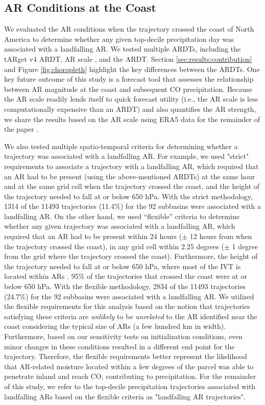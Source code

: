 \documentclass[draft]{agujournal2019}
\begin{document}
\subsection{AR Conditions at the Coast}
\label{sec:methods:ar_conditions}
We evaluated the AR conditions when the trajectory crossed the coast of North America to determine whether any given top-decile precipitation day was associated with a landfalling AR. We tested multiple ARDTs, including the  tARget v4 ARDT, AR scale \cite{MartinRalph2019}, and the  ARDT. Section \ref{sec:results:contribution} and Figure \ref{fig:choropleth} highlight the key differences between the ARDTs. One key future outcome of this study is a forecast tool that assesses the relationship between AR magnitude at the coast and subsequent CO precipitation. Because the AR scale readily lends itself to quick forecast utility (i.e., the AR scale is less computationally expensive than an ARDT) and also quantifies the AR strength, we share the results based on the AR scale using ERA5 data for the remainder of the paper \cite{MartinRalph2019}.

We also tested multiple spatio-temporal criteria for determining whether a trajectory was associated with a landfalling AR. For example, we used "strict" requirements to associate a trajectory with a landfalling AR, which required that an AR had to be present (using the above-mentioned ARDTs) at the same hour and at the same grid cell when the trajectory crossed the coast, and the height of the trajectory needed to fall at or below 650 hPa. With the strict methodology, 1314 of the 11493 trajectories (11.4\%) for the 92 subbasins were associated with a landfalling AR. On the other hand, we used “flexible” criteria to determine whether any given trajectory was associated with a landfalling AR, which required that an AR had to be present within 24 hours ($\pm$ 12 hours from when the trajectory crossed the coast), in any grid cell within 2.25 degrees ($\pm$ 1 degree from the grid where the trajectory crossed the coast). Furthermore, the height of the trajectory needed to fall at or below 650 hPa, where most of the IVT is located within ARs \cite{Guan2015}. 95\% of the trajectories that crossed the coast were at or below 650 hPa. With the flexible methodology, 2834 of the 11493 trajectories (24.7\%) for the 92 subbasins were associated with a landfalling AR. We utilized the flexible requirements for this analysis based on the notion that trajectories satisfying these criteria are \textit{unlikely} to be \textit{unrelated} to the AR identified near the coast considering the typical size of ARs (a few hundred km in width). Furthermore, based on our sensitivity tests on initialization conditions, even minor changes in these conditions resulted in a different end point for the trajectory. Therefore, the flexible requirements better represent the likelihood that AR-related moisture located within a few degrees of the parcel was able to penetrate inland and reach CO, contributing to precipitation. For the remainder of this study, we refer to the top-decile precipitation trajectories associated with landfalling ARs based on the flexible criteria as "landfalling AR trajectories". 
\end{document}
